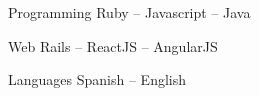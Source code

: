 

\begin{cvskills}

  \cvskill
    {Programming} %
    {Ruby – Javascript – Java} %

  \cvskill
    {Web} %
    {Rails – ReactJS – AngularJS} %

  \cvskill
    {Languages} %
    {Spanish – English} %

\end{cvskills}
